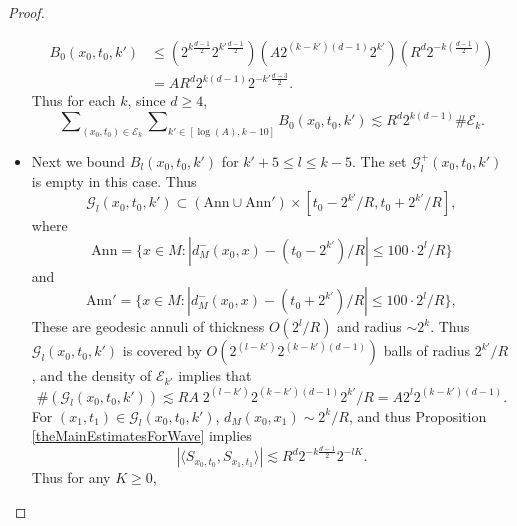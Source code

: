 \begin{proof}
\begin{itemize}
    \begin{align*}
        B_0(x_0,t_0,k') &\leq (2^{k \frac{d-1}{2}} 2^{k' \frac{d-1}{2}}) ( A 2^{(k-k')(d-1)} 2^{k'} )  ( R^d 2^{-k \left( \frac{d-1}{2} \right)} )\\
        &= A R^d 2^{k(d-1)} 2^{-k' \frac{d-3}{2}}.
    \end{align*}
    Thus for each $k$, since $d \geq 4$,
    \begin{equation} \label{AAAlowbounds}
        \sum\nolimits_{(x_0,t_0) \in \mathcal{E}_k} \sum\nolimits_{k' \in [\log(A), k - 10]} B_0(x_0,t_0,k') \lesssim R^{d} 2^{k (d-1)} \# \mathcal{E}_k.
    \end{equation}

    \item Next we bound $B_l(x_0,t_0,k')$ for $k' + 5 \leq l \leq k - 5$. The set $\mathcal{G}_l^+(x_0,t_0,k')$ is empty in this case. Thus
    \begin{equation}
        \mathcal{G}_l(x_0,t_0,k') \subset ( \text{Ann} \cup \text{Ann}' ) \times [t_0 - 2^{k'} / R, t_0 + 2^{k'} / R],
    \end{equation}
    where
    \begin{equation}
        \text{Ann} = \{ x \in M: |d_M^-(x_0,x) - (t_0 - 2^{k'}) / R| \leq 100 \cdot 2^l / R \}
    \end{equation}
    and
    \begin{equation}
        \text{Ann}' = \{ x \in M: |d_M^-(x_0,x) - (t_0 + 2^{k'}) / R| \leq 100 \cdot 2^l / R \},
    \end{equation}
    These are geodesic annuli of thickness $O(2^l / R)$ and radius $\sim 2^k$. Thus $\mathcal{G}_l(x_0,t_0,k')$ is covered by $O( 2^{(l-k')} 2^{(k-k')(d-1)} )$ balls of radius $2^{k'} / R$, and the density of $\mathcal{E}_{k'}$ implies that
    \begin{equation}
        \#(\mathcal{G}_l(x_0,t_0,k')) \lesssim R A\; 2^{(l-k')} 2^{(k-k')(d-1)} 2^{k'} / R = A 2^{l} 2^{(k-k')(d-1)}.
    \end{equation}
    For $(x_1,t_1) \in \mathcal{G}_l(x_0,t_0,k')$, $d_M(x_0,x_1) \sim 2^k / R$, and thus Proposition \ref{theMainEstimatesForWave} implies
    \begin{equation}
        |\langle {S\!}_{x_0,t_0}, {S\!}_{x_1,t_1} \rangle| \lesssim R^d 2^{-k \frac{d-1}{2}} 2^{-lK}.
    \end{equation}
    Thus for any $K \geq 0$,
    \begin{equation}

\end{equation}
\end{itemize}
\end{proof}
